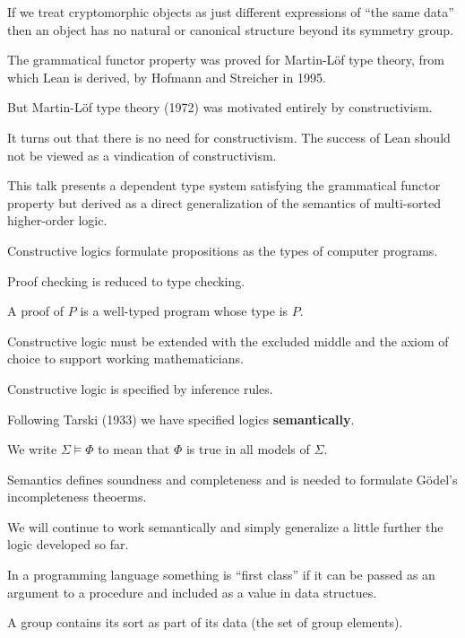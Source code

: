 {\vfill
If we treat cryptomorphic objects as just different expressions of ``the same data'' then an object has no natural or canonical structure beyond its symmetry group.



The grammatical functor property was proved for Martin-L\"{o}f type theory, from which Lean is derived, by Hofmann and Streicher in 1995.

\vfill
But Martin-L\"{o}f type theory (1972) was motivated entirely by constructivism.


\vfill
It turns out that there is no need for constructivism.  The success of Lean should not be viewed as a vindication of constructivism.

\vfill
This talk presents a dependent type system satisfying the grammatical functor property but derived as a direct generalization of the semantics of multi-sorted higher-order logic.


Constructive logics formulate propositions as the types of computer programs.

\vfill
Proof checking is reduced to type checking.

\vfill
A proof of $P$ is a well-typed program whose type is $P$.

\vfill
Constructive logic must be extended with the excluded middle and the axiom of choice to support working mathematicians.


Constructive logic is specified by inference rules.

\vfill
Following Tarski (1933) we have specified logics {\bf semantically}.

\vfill
We write $\Sigma \models \Phi$ to mean that $\Phi$ is true in all models of $\Sigma$.

\vfill Semantics defines soundness and completeness and is needed to formulate G\"{o}del's incompleteness theoerms.

\vfill
We will continue to work semantically and simply generalize a little further the logic developed so far.


In a programming language something is ``first class'' if it can be passed as an argument to a procedure and included as a value in data structues.

\vfill
A group contains its sort as part of its data (the set of group elements).

}
